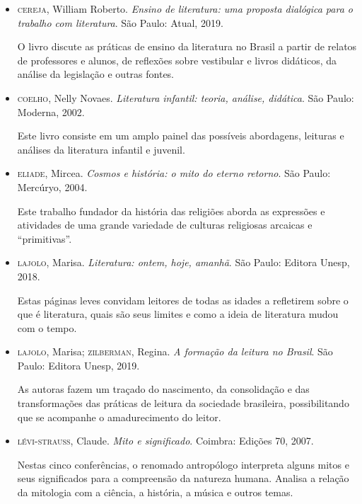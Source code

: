 \documentclass[12pt]{extarticle}
\begin{document}
\begin{itemize}
\item\textsc{cereja}, William Roberto. \textit{Ensino de literatura: uma proposta
dialógica para o trabalho com literatura}. São Paulo: Atual, 2019.

O livro discute as práticas de ensino da literatura no Brasil a partir
de relatos de professores e alunos, de reflexões sobre vestibular e
livros didáticos, da análise da legislação e outras fontes.

\item\textsc{coelho}, Nelly Novaes. \textit{Literatura infantil: teoria, análise,
didática}. São Paulo: Moderna, 2002.

Este livro consiste em um amplo painel das possíveis abordagens,
leituras e análises da literatura infantil e juvenil.

\item\textsc{eliade}, Mircea. \textit{Cosmos e história: o mito do eterno retorno}.
São Paulo: Mercúryo, 2004.

Este trabalho fundador da história das religiões aborda as expressões e
atividades de uma grande variedade de culturas religiosas arcaicas e
``primitivas''.

\item\textsc{lajolo}, Marisa. \textit{Literatura: ontem, hoje, amanhã}. São Paulo:
Editora Unesp, 2018.

Estas páginas leves convidam leitores de todas as idades a refletirem
sobre o que é literatura, quais são seus limites e como a ideia de
literatura mudou com o tempo.

\item\textsc{lajolo}, Marisa; \textsc{zilberman}, Regina. \textit{A formação da leitura no
Brasil}. São Paulo: Editora Unesp, 2019.

As autoras fazem um traçado do nascimento, da consolidação e das
transformações das práticas de leitura da sociedade brasileira,
possibilitando que se acompanhe o amadurecimento do leitor.

\item\textsc{lévi-strauss}, Claude. \textit{Mito e significado}. Coimbra: Edições 70,
2007.

Nestas cinco conferências, o renomado antropólogo interpreta alguns
mitos e seus significados para a compreensão da natureza humana. Analisa
a relação da mitologia com a ciência, a história, a música e outros
temas.
\end{itemize}
\end{document}
